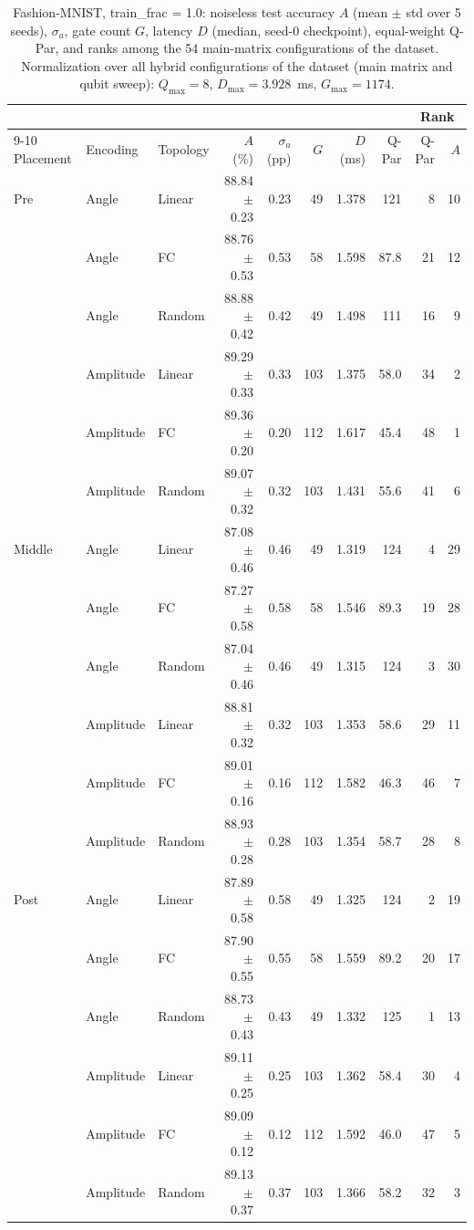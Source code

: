 \begin{table}[!t]
\centering
\caption{Fashion-MNIST, train\_frac = 1.0: noiseless test accuracy $A$ (mean $\pm$ std over 5 seeds), $\sigma_a$, gate count $G$, latency $D$ (median, seed-0 checkpoint), equal-weight Q-Par, and ranks among the 54 main-matrix configurations of the dataset. Normalization over all hybrid configurations of the dataset (main matrix and qubit sweep): $Q_{\max} = 8$, $D_{\max} = 3.928$~ms, $G_{\max} = 1174$.}
\label{tab:fashionmnist_tf1}
\footnotesize
\begin{tabular}{lllrrrrrrr}
\toprule
 &  &  &  &  &  &  &  & \multicolumn{2}{c}{Rank} \\
\cmidrule(lr){9-10}
Placement & Encoding & Topology & $A$ (\%) & $\sigma_a$ (pp) & $G$ & $D$ (ms) & Q-Par & Q-Par & $A$ \\
\midrule
Pre & Angle & Linear & 88.84 $\pm$ 0.23 & 0.23 & 49 & 1.378 & 121 & 8 & 10 \\
 & Angle & FC & 88.76 $\pm$ 0.53 & 0.53 & 58 & 1.598 & 87.8 & 21 & 12 \\
 & Angle & Random & 88.88 $\pm$ 0.42 & 0.42 & 49 & 1.498 & 111 & 16 & 9 \\
 & Amplitude & Linear & 89.29 $\pm$ 0.33 & 0.33 & 103 & 1.375 & 58.0 & 34 & 2 \\
 & Amplitude & FC & 89.36 $\pm$ 0.20 & 0.20 & 112 & 1.617 & 45.4 & 48 & 1 \\
 & Amplitude & Random & 89.07 $\pm$ 0.32 & 0.32 & 103 & 1.431 & 55.6 & 41 & 6 \\
\midrule
Middle & Angle & Linear & 87.08 $\pm$ 0.46 & 0.46 & 49 & 1.319 & 124 & 4 & 29 \\
 & Angle & FC & 87.27 $\pm$ 0.58 & 0.58 & 58 & 1.546 & 89.3 & 19 & 28 \\
 & Angle & Random & 87.04 $\pm$ 0.46 & 0.46 & 49 & 1.315 & 124 & 3 & 30 \\
 & Amplitude & Linear & 88.81 $\pm$ 0.32 & 0.32 & 103 & 1.353 & 58.6 & 29 & 11 \\
 & Amplitude & FC & 89.01 $\pm$ 0.16 & 0.16 & 112 & 1.582 & 46.3 & 46 & 7 \\
 & Amplitude & Random & 88.93 $\pm$ 0.28 & 0.28 & 103 & 1.354 & 58.7 & 28 & 8 \\
\midrule
Post & Angle & Linear & 87.89 $\pm$ 0.58 & 0.58 & 49 & 1.325 & 124 & 2 & 19 \\
 & Angle & FC & 87.90 $\pm$ 0.55 & 0.55 & 58 & 1.559 & 89.2 & 20 & 17 \\
 & Angle & Random & 88.73 $\pm$ 0.43 & 0.43 & 49 & 1.332 & 125 & 1 & 13 \\
 & Amplitude & Linear & 89.11 $\pm$ 0.25 & 0.25 & 103 & 1.362 & 58.4 & 30 & 4 \\
 & Amplitude & FC & 89.09 $\pm$ 0.12 & 0.12 & 112 & 1.592 & 46.0 & 47 & 5 \\
 & Amplitude & Random & 89.13 $\pm$ 0.37 & 0.37 & 103 & 1.366 & 58.2 & 32 & 3 \\
\bottomrule
\end{tabular}
\end{table}
